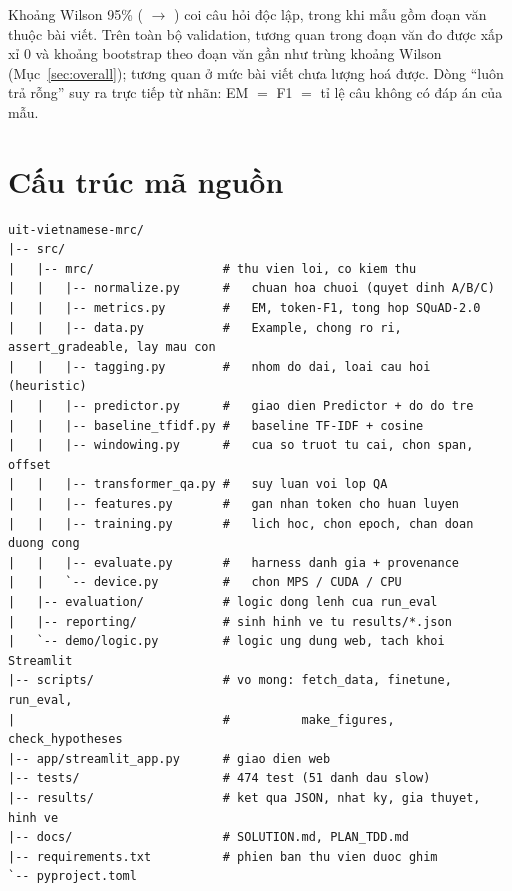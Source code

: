 \begin{table}[htbp]
\begin{tabular}{@{}l r c r c r c r@{}}
\bottomrule
\end{tabular}
\par\vspace{2pt}
{\footnotesize Khoảng Wilson 95\% ( $\to$ ) coi câu hỏi độc lập, trong khi mẫu gồm \overlapHistContexts{} đoạn văn thuộc \overlapHistArticles{} bài viết. Trên toàn bộ validation, tương quan trong đoạn văn đo được xấp xỉ 0 và khoảng bootstrap theo đoạn văn gần như trùng khoảng Wilson (Mục~\ref{sec:overall}); tương quan ở mức bài viết chưa lượng hoá được. Dòng ``luôn trả rỗng'' suy ra trực tiếp từ nhãn: EM $=$ F1 $=$ tỉ lệ câu không có đáp án của mẫu.}
\end{table}

\section{Cấu trúc mã nguồn}
\label{app:structure}

\begin{lstlisting}
uit-vietnamese-mrc/
|-- src/
|   |-- mrc/                  # thu vien loi, co kiem thu
|   |   |-- normalize.py      #   chuan hoa chuoi (quyet dinh A/B/C)
|   |   |-- metrics.py        #   EM, token-F1, tong hop SQuAD-2.0
|   |   |-- data.py           #   Example, chong ro ri, assert_gradeable, lay mau con
|   |   |-- tagging.py        #   nhom do dai, loai cau hoi (heuristic)
|   |   |-- predictor.py      #   giao dien Predictor + do do tre
|   |   |-- baseline_tfidf.py #   baseline TF-IDF + cosine
|   |   |-- windowing.py      #   cua so truot tu cai, chon span, offset
|   |   |-- transformer_qa.py #   suy luan voi lop QA
|   |   |-- features.py       #   gan nhan token cho huan luyen
|   |   |-- training.py       #   lich hoc, chon epoch, chan doan duong cong
|   |   |-- evaluate.py       #   harness danh gia + provenance
|   |   `-- device.py         #   chon MPS / CUDA / CPU
|   |-- evaluation/           # logic dong lenh cua run_eval
|   |-- reporting/            # sinh hinh ve tu results/*.json
|   `-- demo/logic.py         # logic ung dung web, tach khoi Streamlit
|-- scripts/                  # vo mong: fetch_data, finetune, run_eval,
|                             #          make_figures, check_hypotheses
|-- app/streamlit_app.py      # giao dien web
|-- tests/                    # 474 test (51 danh dau slow)
|-- results/                  # ket qua JSON, nhat ky, gia thuyet, hinh ve
|-- docs/                     # SOLUTION.md, PLAN_TDD.md
|-- requirements.txt          # phien ban thu vien duoc ghim
`-- pyproject.toml
\end{lstlisting}

